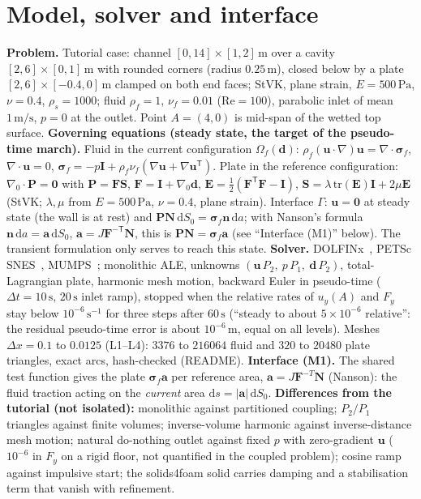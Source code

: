 \documentclass[sn-mathphys,Numbered]{sn-jnl}
\begin{document}
\section{Model, solver and interface}\label{sec:cv_model}
\textbf{Problem.} Tutorial case: channel $[0,14]\times[1,2]\,\mathrm m$ over a cavity $[2,6]\times[0,1]\,\mathrm m$ with rounded corners (radius $0.25\,\mathrm m$), closed below by a plate $[2,6]\times[-0.4,0]\,\mathrm m$ clamped on both end faces; StVK, plane strain, $E=500\,\mathrm{Pa}$, $\nu=0.4$, $\rho_s=1000$; fluid $\rho_f=1$, $\nu_f=0.01$ ($\mathrm{Re}=100$), parabolic inlet of mean $1\,\mathrm{m/s}$, $p=0$ at the outlet. Point $A=(4,0)$ is mid-span of the wetted top surface.
\textbf{Governing equations (steady state, the target of the pseudo-time march).} Fluid in the current configuration $\Omega_f(\bm d)$: $\rho_f(\bm u\!\cdot\!\nabla)\bm u=\nabla\!\cdot\!\bm\sigma_f$, $\nabla\!\cdot\!\bm u=0$, $\bm\sigma_f=-p\bm I+\rho_f\nu_f(\nabla\bm u+\nabla\bm u^{\mathsf T})$. Plate in the reference configuration: $\nabla_{\!0}\!\cdot\!\bm P=\bm 0$ with $\bm P=\bm F\bm S$, $\bm F=\bm I+\nabla_{\!0}\bm d$, $\bm E=\tfrac12(\bm F^{\mathsf T}\bm F-\bm I)$, $\bm S=\lambda\,\mathrm{tr}(\bm E)\bm I+2\mu\bm E$ (StVK; $\lambda,\mu$ from $E=500\,\mathrm{Pa}$, $\nu=0.4$, plane strain). Interface $\Gamma$: $\bm u=\bm 0$ at steady state (the wall is at rest) and $\bm P\bm N\,\mathrm dS_0=\bm\sigma_f\bm n\,\mathrm da$; with Nanson's formula $\bm n\,\mathrm da=\bm a\,\mathrm dS_0$, $\bm a=J\bm F^{-\mathsf T}\bm N$, this is $\bm P\bm N=\bm\sigma_f\bm a$ (see ``Interface (M1)'' below). The transient formulation only serves to reach this state.
\textbf{Solver.} DOLFINx~\citep{Baratta2023}, PETSc SNES~\citep{PETSc}, MUMPS~\citep{MUMPS:1,MUMPS:2}; monolithic ALE, unknowns $(\bm u\,P_2,\ p\,P_1,\ \bm d\,P_2)$, total-Lagrangian plate, harmonic mesh motion, backward Euler in pseudo-time ($\Delta t=10\,\mathrm s$, $20\,\mathrm s$ inlet ramp), stopped when the relative rates of $u_y(A)$ and $F_y$ stay below $10^{-6}\,\mathrm{s^{-1}}$ for three steps after $60\,\mathrm s$ (``steady to about $5\times10^{-6}$ relative'': the residual pseudo-time error is about $10^{-6}\,\mathrm m$, equal on all levels). Meshes $\Delta x=0.1$ to $0.0125$ (L1--L4): $3376$ to $216064$ fluid and $320$ to $20480$ plate triangles, exact arcs, hash-checked (README).
\textbf{Interface (M1).} The shared test function gives the plate $\bm\sigma_f\bm a$ per reference area, $\bm a=J\bm F^{-T}\bm N$ (Nanson): the fluid traction acting on the \emph{current} area $\mathrm ds=|\bm a|\,\mathrm dS_0$.
\textbf{Differences from the tutorial (not isolated):} monolithic against partitioned coupling; $P_2/P_1$ triangles against finite volumes; inverse-volume harmonic against inverse-distance mesh motion; natural do-nothing outlet against fixed $p$ with zero-gradient $\bm u$ ($10^{-6}$ in $F_y$ on a rigid floor, not quantified in the coupled problem); cosine ramp against impulsive start; the solids4foam solid carries damping and a stabilisation term that vanish with refinement.
\end{document}
